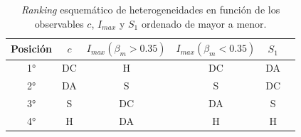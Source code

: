 \begin{table}[h]
    \centering
    \caption{\textit{Ranking} esquemático de heterogeneidades en función de los observables $c$, $I_{max}$ y $S_1$ ordenado de mayor a menor.}
    \label{tab:ranking}
    \begin{tabular}{@{}cccccc@{}}
    \toprule
    Posición & $c$     & $I_{max}(\beta_m >0.35 )$ & $I_{max}(\beta_m <0.35 )$ & $S_1$ \\ \midrule
    1°    & DC  & H & DC & DA\\
    2°    & DA  & S & S & DC\\
    3°    & S   & DC & DA & S\\
    4°    & H   & DA & H &  H\\ \bottomrule
    \end{tabular}
\end{table}




